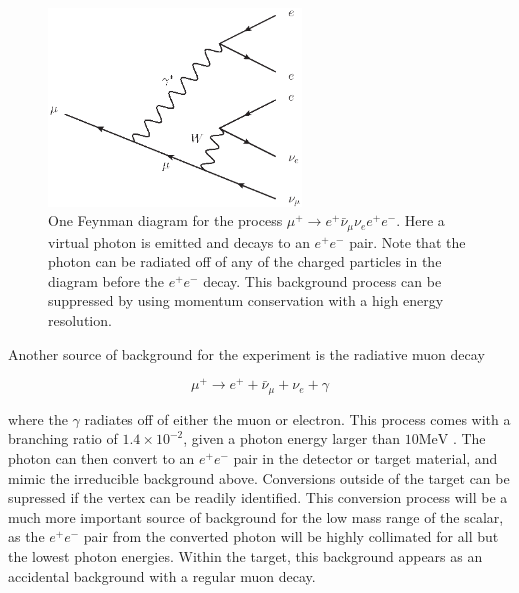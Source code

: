 \begin{figure}[h]
    \centering
    \includegraphics[width = 0.6\textwidth]{Figures/feynman_diagrams/mu_eeenunu_SM.eps}
    \caption{One Feynman diagram for the process $\mu^+ \rightarrow e^+ \bar{\nu}_\mu \nu_e e^+ e^-$. Here a virtual photon is emitted and decays to an $e^+ e^-$ pair. Note that the photon can be radiated off of any of the charged particles in the diagram before the $e^+ e^-$ decay. This background process can be suppressed by using momentum conservation with a high energy resolution.}
    \label{fig:mu_eeenunu_SM}
\end{figure}


Another source of background for the experiment is the radiative muon decay

\begin{equation}
    \mu^+ \rightarrow e^+ + \bar{\nu}_\mu + \nu_e + \gamma
\end{equation}

\noindent where the $\gamma$ radiates off of either the muon or electron.
This process comes with a branching ratio of $1.4 \times 10^{-2}$, given a photon energy larger than $10\textrm{MeV}$ \cite{Agashe:2014kda}.
The photon can then convert to an $e^+ e^-$ pair in the detector or target material, and mimic the irreducible background above.
Conversions outside of the target can be supressed if the vertex can be readily identified.
This conversion process will be a much more important source of background for the low mass range of the scalar, as the $e^+ e^-$ pair from the converted photon will be highly collimated for all but the lowest photon energies.
Within the target, this background appears as an accidental background with a regular muon decay.

